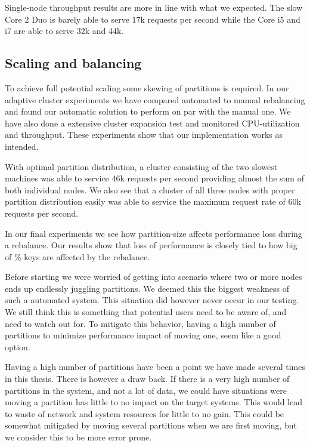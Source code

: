 Single-node throughput results are more in line with what we expected. The slow Core 2 Duo is barely able to serve 17k requests per second while the Core i5 and i7 are able to serve 32k and 44k. 

\subsection{Scaling and balancing}
\label{eval:balance}
To achieve full potential scaling some skewing of partitions is required. In our adaptive cluster experiments we have compared automated to manual rebalancing and found our automatic solution to perform on par with the manual one. We have also done a extensive cluster expansion test and monitored CPU-utilization and throughput. These experiments show that our implementation works as intended. 

With optimal partition distribution, a cluster consisting of the two slowest machines was able to service 46k requests per second providing almost the sum of both individual nodes. We also see that a cluster of all three nodes with proper partition distribution easily was able to service the maximum request rate of 60k requests per second. 

In our final experiments we see how partition-size affects performance loss during a rebalance. Our results show that loss of performance is closely tied to how big of \% keys are affected by the rebalance. 

Before starting we were worried of getting into scenario where two or more nodes ends up endlessly juggling partitions. We deemed this the biggest weakness of such a automated system. This situation did however never occur in our testing. We still think this is something that potential users need to be aware of, and need to watch out for. To mitigate this behavior, having a high number of partitions to minimize performance impact of moving one, seem like a good option.

Having a high number of partitions have been a point we have made several times in this thesis. There is however a draw back. If there is a very high number of partitions in the system, and not a lot of data, we could have situations were moving a partition has little to no impact on the target systems. This would lead to waste of network and system resources for little to no gain. This could be somewhat mitigated by moving several partitions when we are first moving, but we consider this to be more error prone. 



